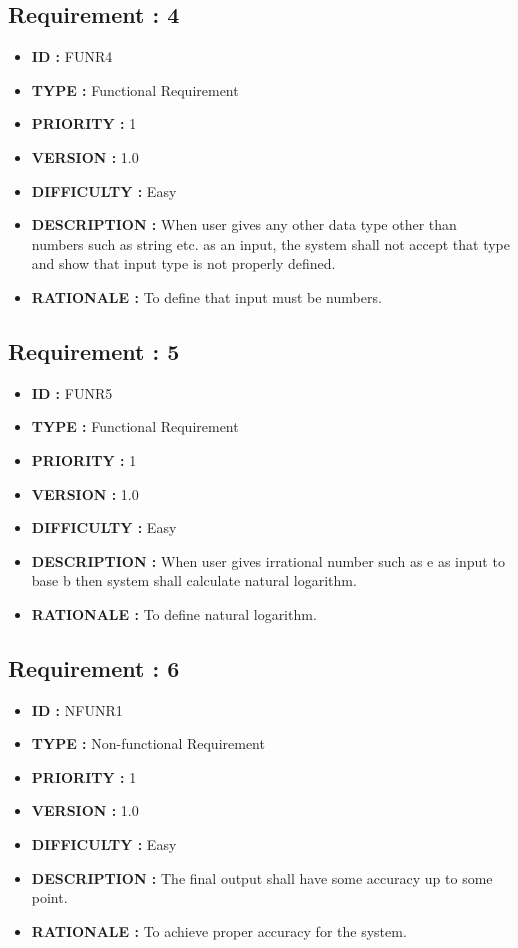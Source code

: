 \documentclass[12pt]{report}
\begin{document}
{\subsection*{Requirement : 4}
     \begin{itemize}
      \item \textbf{ID  : } FUNR4
      \item \textbf{TYPE  : } Functional Requirement
      \item \textbf{PRIORITY  : } 1
      \item \textbf{VERSION  : } 1.0
      \item\textbf{DIFFICULTY  :} Easy
      \item \textbf{DESCRIPTION  : } When user gives any other data type other than numbers such as string etc. as an input, the system shall not accept that type and show that input type is not properly defined.
      \item\textbf{RATIONALE  : } To define that input must be numbers.
    \end{itemize}
    
\subsection*{Requirement : 5}
     \begin{itemize}
      \item \textbf{ID  : } FUNR5
      \item \textbf{TYPE  : } Functional Requirement
      \item \textbf{PRIORITY  : } 1
      \item \textbf{VERSION  : } 1.0
      \item\textbf{DIFFICULTY  :} Easy
      \item \textbf{DESCRIPTION  : } When user gives irrational number such as e as input to base b then system shall calculate natural logarithm.
      \item\textbf{RATIONALE  : } To define natural logarithm.
    \end{itemize}
 
 
 \subsection*{Requirement : 6}
     \begin{itemize}
      \item \textbf{ID  : } NFUNR1
      \item \textbf{TYPE  : } Non-functional Requirement
      \item \textbf{PRIORITY  : } 1
      \item \textbf{VERSION  : } 1.0
      \item\textbf{DIFFICULTY  :} Easy
      \item \textbf{DESCRIPTION  : } The final output shall have some accuracy up to some point.
      \item\textbf{RATIONALE  : } To achieve proper accuracy for the system.
    \end{itemize}

}
\end{document}
